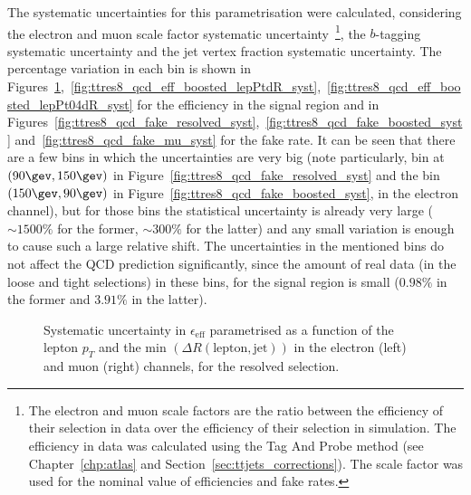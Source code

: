 The systematic uncertainties for this parametrisation were calculated, considering the electron and muon scale factor systematic uncertainty~\footnote{The
electron and muon scale factors are the ratio between the efficiency of their selection in data over the efficiency of their selection in simulation. The efficiency
in data was calculated using the Tag And Probe method (see Chapter~\ref{chp:atlas} and Section~\ref{sec:ttjets_corrections}). The scale factor was used for the nominal
value of efficiencies and fake rates.}, the $b$-tagging systematic uncertainty and the jet vertex fraction systematic uncertainty.
The percentage variation in each bin is shown
in Figures~\ref{fig:ttres8_qcd_eff_resolved_lepPtdR_syst},~\ref{fig:ttres8_qcd_eff_boosted_lepPtdR_syst},~\ref{fig:ttres8_qcd_eff_boosted_lepPt04dR_syst} for the
efficiency in the signal region and in Figures~\ref{fig:ttres8_qcd_fake_resolved_syst},~\ref{fig:ttres8_qcd_fake_boosted_syst} and~\ref{fig:ttres8_qcd_fake_mu_syst} for the fake rate.
It can be seen that there are a few bins in which the uncertainties are very big (note particularly, bin at $(90\gev, 150\gev)$ in
Figure~\ref{fig:ttres8_qcd_fake_resolved_syst} and the bin $(150\gev,90\gev)$ in Figure~\ref{fig:ttres8_qcd_fake_boosted_syst}, in the electron channel),
but for those bins the statistical uncertainty is already very large ($\sim 1500\%$ for the former, $\sim 300\%$ for the latter)
and any small variation is enough to
cause such a large relative shift. The uncertainties in the mentioned bins do not affect the QCD prediction significantly, since the amount of real data (in the
loose and tight selections) in these bins, for the
signal region is small ($0.98\%$ in the former and $3.91\%$ in the latter).

\begin{figure}
\centering
{}
\caption{Systematic uncertainty in $\epsilon_{\mathrm{eff}}$ parametrised as a function of the lepton $p_T$ and the min $(\Delta R(\textrm{lepton}, \textrm{jet}))$ in the electron (left) and muon (right) channels, for the resolved selection.}
\label{fig:ttres8_qcd_eff_resolved_lepPtdR_syst}
\end{figure}

